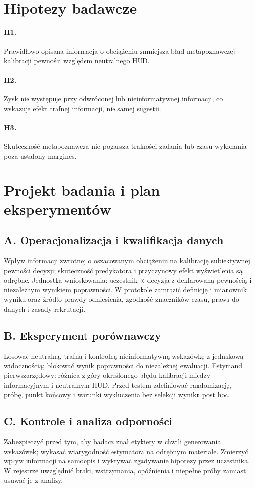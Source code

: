 \documentclass[11pt,a4paper]{article}
\begin{document}
\section{Hipotezy badawcze}
\paragraph{H1.} Prawidłowo opisana informacja o obciążeniu zmniejsza błąd metapoznawczej kalibracji pewności względem neutralnego HUD.
\paragraph{H2.} Zysk nie występuje przy odwróconej lub nieinformatywnej informacji, co wskazuje efekt trafnej informacji, nie samej sugestii.
\paragraph{H3.} Skuteczność metapoznawcza nie pogarsza trafności zadania lub czasu wykonania poza ustalony margines.
\section{Projekt badania i plan eksperymentów}
\subsection{A. Operacjonalizacja i kwalifikacja danych}
Wpływ informacji zwrotnej o oszacowanym obciążeniu na kalibrację subiektywnej pewności decyzji; skuteczność predykatora i przyczynowy efekt wyświetlenia są odrębne. Jednostka wnioskowania: uczestnik × decyzja z deklarowaną pewnością i niezależnym wynikiem poprawności. W protokole zamrozić definicję i mianownik wyniku oraz źródło prawdy odniesienia, zgodność znaczników czasu, prawa do danych i zasady rekrutacji.
\subsection{B. Eksperyment porównawczy}
Losować neutralną, trafną i kontrolną nieinformatywną wskazówkę z jednakową widocznością; blokować wynik poprawności do niezależnej ewaluacji. Estymand pierwszorzędowy: różnica z góry określonego błędu kalibracji między informacyjnym i neutralnym HUD. Przed testem zdefiniować randomizację, próbę, punkt końcowy i warunki wykluczenia bez selekcji wyniku post hoc.
\subsection{C. Kontrole i analiza odporności}
Zabezpieczyć przed tym, aby badacz znał etykiety w chwili generowania wskazówek; wykazać wiarygodność estymatora na odrębnym materiale. Zmierzyć wpływ informacji na samoopis i wykrywać zgadywanie hipotezy przez uczestnika. W rejestrze uwzględnić braki, wstrzymania, opóźnienia i niepełne próby zamiast usuwać je z analizy.
\end{document}

